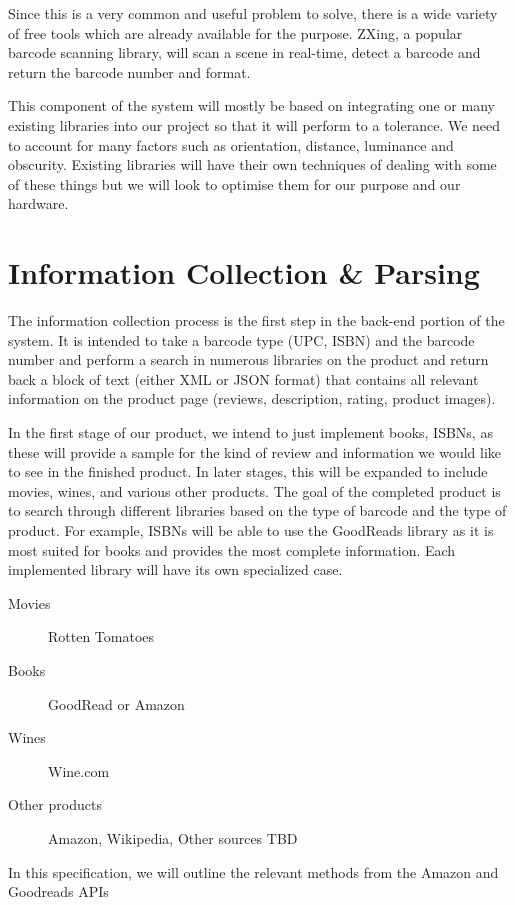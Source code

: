 \documentclass[12pt,a4paper]{report}
\begin{document}
Since this is a very common and useful problem to solve, there is a wide variety of free tools which are already available for the purpose. ZXing, a popular barcode scanning library, will scan a scene in real-time, detect a barcode and return the barcode number and format.

This component of the system will mostly be based on integrating one or many existing libraries into our project so that it will perform to a tolerance. We need to account for many factors such as orientation, distance, luminance and obscurity. Existing libraries will have their own techniques of dealing with some of these things but we will look to optimise them for our purpose and our hardware.

\section{Information Collection \& Parsing}

The information collection process is the first step in the back-end portion of the system. It is intended to take a barcode type (UPC, ISBN) and the barcode number and perform a search in numerous libraries on the product and return back a block of text (either XML or JSON format) that contains all relevant information on the product page (reviews, description, rating, product images).

In the first stage of our product, we intend to just implement books, ISBNs, as these will provide a sample for the kind of review and information we would like to see in the finished product. In later stages, this will be expanded to include movies, wines, and various other products. The goal of the completed product is to search through different libraries based on the type of barcode and the type of product. For example, ISBNs will be able to use the GoodReads library as it is most suited for books and provides the most complete information. Each implemented library will have its own specialized case.

\begin{description}
	\item[Movies] Rotten Tomatoes
	\item[Books] GoodRead or Amazon
	\item[Wines] Wine.com
	\item[Other products] Amazon, Wikipedia, Other sources TBD
\end{description}

In this specification, we will outline the relevant methods from the Amazon and Goodreads APIs
\end{document}
